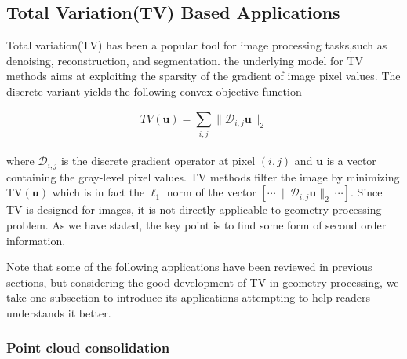 \subsection{Total Variation(TV) Based Applications}
\label{subsec:TV Applications}

%
%

Total variation(TV) has been a popular tool for image processing tasks,such as denoising, reconstruction, and segmentation\cite{chambolle2010introduction}.
the underlying model for TV methods aims at exploiting the sparsity of the gradient of image pixel values.
The discrete variant yields the following convex objective function

\small{
\begin{equation}
 \label{eq:descreteTV}
 TV(\mathbf{u})=\sum_{i,j}^{}\|\mathcal{D}_{i,j} \mathbf{u}\|_2
\end{equation}
}
\\
where $\mathcal{D}_{i,j}$ is the discrete gradient operator at pixel $(i,j)$ and $\mathbf{u}$ is a vector containing the gray-level pixel values. TV methods filter the image by minimizing TV$(\mathbf{u})$ which is in fact the $\ell_1$ norm of the vector $[\cdots~\|\mathcal{D}_{i,j}\mathbf{u}\|_2~\cdots]$.
Since TV is designed for images, it is not directly applicable to geometry processing problem.
As we have stated, the key point is to find some form of second order information.

Note that some of the following applications have been reviewed in previous sections, but considering the good development of TV in geometry processing, we take one subsection to introduce its applications attempting to help readers understands it better.

\subsubsection{Point cloud consolidation}
\label{subsubsec:TVPoint cloud consolidation}

